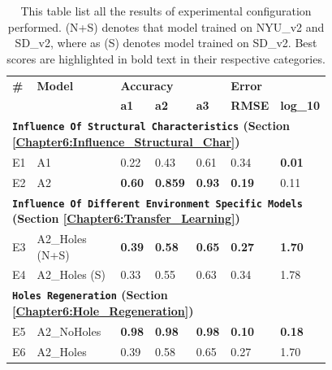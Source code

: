 \bgroup
\def\arraystretch{1.35}%
\begin{table}[h]
\begin{tabular}{p{0.05\linewidth}p{0.3\linewidth}p{0.1\linewidth}p{0.1\linewidth}p{0.08\linewidth}p{0.08\linewidth}p{0.07\linewidth}}
\hline
\textbf{\#} & \textbf{Model} & \multicolumn{3}{l}{\textbf{Accuracy}} & \multicolumn{2}{l}{\textbf{Error}} \\ \cline{3-7} 
                    &                        & \textbf{a1}       & \textbf{a2}       & \textbf{a3}      & \textbf{RMSE}         & \textbf{log\_10}      \\ \hline\hline
\multicolumn{7}{l}{\textbf{\texttt{Influence Of Structural Characteristics} (Section \ref{Chapter6:Influence_Structural_Char})}}                                            \\ \hline
E1                 &  A1  & 0.22         & 0.43          &  0.61       & 0.34            &   \textbf{0.01}           \\ \hline
E2                  & A2  &   \textbf{0.60}  & \textbf{0.859} & \textbf{0.93}      &  \textbf{0.19}          &0.11              \\ \hline 
\multicolumn{7}{l}{\textbf{\texttt{Influence Of Different Environment Specific Models} (Section \ref{Chapter6:Transfer_Learning})}}                                                                   \\ \hline
{E3}                  & {A2\_Holes} (N+S)              & \textbf{0.39}   & \textbf{0.58}   & \textbf{0.65}  & \textbf{0.27}      & \textbf{1.70}       \\ \hline
{E4}                  & {A2\_Holes} (S) & 0.33   & 0.55   & 0.63  & 0.34      & 1.78       \\ \hline
\multicolumn{7}{l}{\textbf{\texttt{Holes Regeneration} (Section \ref{Chapter6:Hole_Regeneration})}}                                                       \\ \hline
{E5}                  & {A2\_NoHoles}            & \textbf{0.98}   & \textbf{0.98}   & \textbf{0.98}  & \textbf{0.10}       & \textbf{0.18}        \\ \hline
{E6}                  & {A2\_Holes}              & 0.39   & 0.58   & 0.65  & 0.27      & 1.70       \\ \hline
\end{tabular}

\caption{This table list all the results of experimental configuration performed. (N+S) denotes that model trained on NYU\_v2 and SD\_v2, where as (S) denotes model trained on SD\_v2. Best scores are highlighted in bold text in their respective categories.}
\label{table:Results_main}
\end{table}
\egroup

